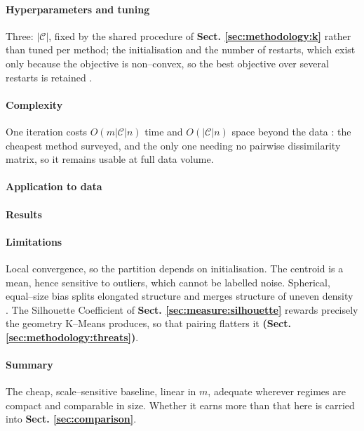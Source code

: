 \paragraph{Hyperparameters and tuning}
\label{sec:tech:kmeans:hyperparameters}
Three: $|\mathcal C|$, fixed by the shared procedure of \textbf{Sect. \ref{sec:methodology:k}} rather than tuned per method; the initialisation and the number of restarts, which exist only because the objective is non–convex, so the best objective over several restarts is retained \cite{ref_2, ref_5}.

\paragraph{Complexity}
\label{sec:tech:kmeans:complexity}
One iteration costs $O(m |\mathcal C| n)$ time and $O(|\mathcal C| n)$ space beyond the data \cite{ref_5, ref_10}: the cheapest method surveyed, and the only one needing no pairwise dissimilarity matrix, so it remains usable at full data volume.

\paragraph{Application to \projectname{} data}
\label{sec:tech:kmeans:application}

\paragraph{Results}
\label{sec:tech:kmeans:results}

\paragraph{Limitations}
\label{sec:tech:kmeans:limitations}
Local convergence, so the partition depends on initialisation. The centroid is a mean, hence sensitive to outliers, which cannot be labelled noise. Spherical, equal–size bias splits elongated structure and merges structure of uneven density \cite{ref_2} \cite{ref_10}.
The Silhouette Coefficient of \textbf{Sect. \ref{sec:measure:silhouette}} rewards precisely the geometry K–Means produces, so that pairing flatters it \textbf{(Sect. \ref{sec:methodology:threats})}.

\paragraph{Summary}
\label{sec:tech:kmeans:summary}
The cheap, scale–sensitive baseline, linear in $m$, adequate wherever regimes are compact and comparable in size. Whether it earns more than that here is carried into \textbf{Sect. \ref{sec:comparison}}.

